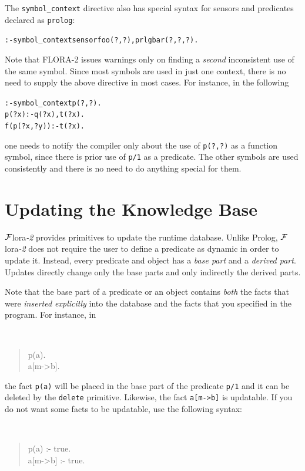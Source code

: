 \documentclass[11pt]{article}
\newcommand{\FLORA}{{\mbox{\sc ${\cal F}${lora}\rm\emph{-2}}}\xspace}
\begin{document}
The \texttt{symbol\_context} directive also
has special syntax for sensors and predicates declared as
\texttt{prolog}:
\begin{alltt}
   :- symbol_context sensor foo(?,?), prlg bar(?,?,?).
\end{alltt}

Note that FLORA-2 issues warnings only on finding a \emph{second}
inconsistent use of the same symbol. Since most symbols are used in just
one context, there is no need to supply the above directive  
in most cases. For instance, in the following
\begin{alltt}
    :- symbol_context p(?,?).
    p(?x):-q(?x), t(?x).
    f(p(?x,?y)):-t(?x).
\end{alltt}
one needs to notify the compiler only about the use of \texttt{p(?,?)} as a
function symbol, since there is prior use of \texttt{p/1} as a predicate.
The other symbols are used consistently and there is no need to do anything
special for them.
\begin{alltt}
\end{alltt}


\section{Updating the Knowledge Base}\label{sec-updates}


%
\FLORA provides primitives to update the runtime database. Unlike Prolog,
\FLORA does not require the user to define a predicate as dynamic in order
to update it. Instead, every predicate and object
has a \emph{base part} and a \emph{derived part}.  Updates directly change
only the base parts and only indirectly the derived parts.

Note that the base part of a predicate or an object contains \emph{both}
the facts that were \emph{inserted explicitly} into the database and the
facts that you specified in the program. For instance, in
{\tt
\begin{quote}
 p(a).\\
 a[m->b].
\end{quote}
}
\noindent
the fact {\tt p(a)} will be placed in the base part of the
predicate {\tt p/1}  and it can be deleted by the {\tt delete}
primitive. Likewise, the fact {\tt a[m->b]} is updatable. If you do not
want some facts to be updatable, use the following syntax:
{\tt
\begin{quote}
 p(a) :- true.\\
 a[m->b] :- true.
\end{quote}
}
\end{document}
